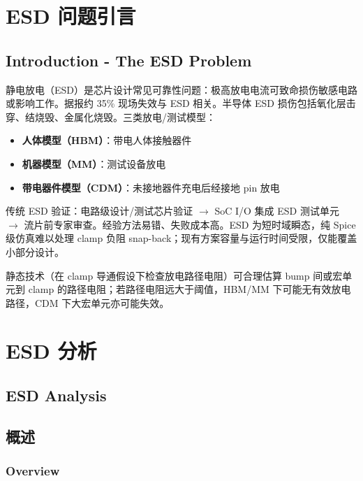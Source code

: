 ﻿%
\label{chap:esd}

\section{ESD 问题引言}
\subsection*{Introduction - The ESD Problem}

静电放电（ESD）是芯片设计常见可靠性问题：极高放电电流可致命损伤敏感电路或影响工作。据报约 35\% 现场失效与 ESD 相关。半导体 ESD 损伤包括氧化层击穿、结烧毁、金属化烧毁。三类放电/测试模型：

\begin{itemize}
  \item \textbf{人体模型（HBM）}：带电人体接触器件
  \item \textbf{机器模型（MM）}：测试设备放电
  \item \textbf{带电器件模型（CDM）}：未接地器件充电后经接地 pin 放电
\end{itemize}


传统 ESD 验证：电路级设计/测试芯片验证 $\rightarrow$ SoC I/O 集成 ESD 测试单元 $\rightarrow$ 流片前专家审查。经验方法易错、失败成本高。ESD 为短时域瞬态，纯 Spice 级仿真难以处理 clamp 负阻 snap-back；现有方案容量与运行时间受限，仅能覆盖小部分设计。

静态技术（在 clamp 导通假设下检查放电路径电阻）可合理估算 bump 间或宏单元到 clamp 的路径电阻；若路径电阻远大于阈值，HBM/MM 下可能无有效放电路径，CDM 下大宏单元亦可能失效。

\section{ESD 分析}
\subsection*{ESD Analysis}

\subsection{概述}
\subsubsection*{Overview}

